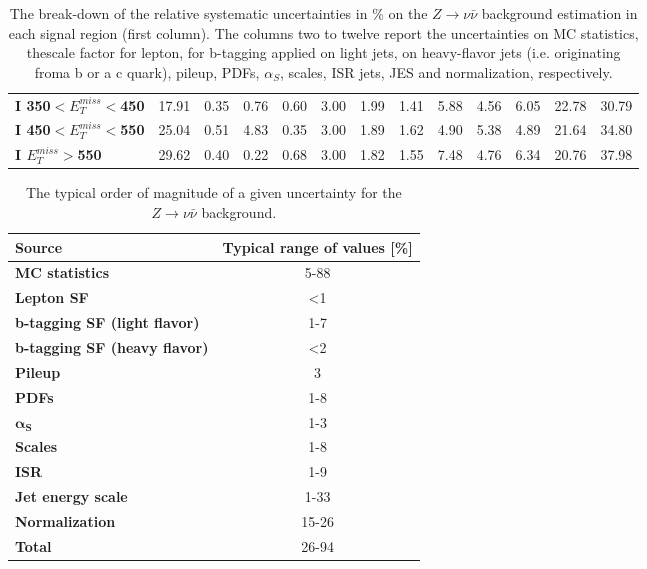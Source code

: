 \begin{table}[h]
\begin{center}
{\begin{tabular}{|l|ccccccccccc|c|}
\textbf{ I 350$<E_T^{miss}<$450}         & 17.91         & 0.35          & 0.76          & 0.60          & 3.00          & 1.99          & 1.41          & 5.88          & 4.56          & 6.05          & 22.78         & 30.79         \\
\textbf{ I 450$<E_T^{miss}<$550}         & 25.04         & 0.51          & 4.83          & 0.35          & 3.00          & 1.89          & 1.62          & 4.90          & 5.38          & 4.89          & 21.64         & 34.80         \\
\textbf{ I $E_T^{miss}>$550}    & 29.62         & 0.40          & 0.22          & 0.68          & 3.00          & 1.82          & 1.55          & 7.48          & 4.76          & 6.34          & 20.76         & 37.98         \\
\hline
\end{tabular}}
\caption[Table caption text]{The break-down of the relative systematic uncertainties in \% on the $Z \to \nu \bar{\nu}$ background estimation in each signal region (first column). The columns two to twelve report the uncertainties on MC statistics, thescale factor for lepton, for b-tagging applied on light jets, on heavy-flavor jets (i.e. originating froma  b or a c quark), pileup, PDFs, $\alpha_{S}$, scales, ISR jets, JES and normalization, respectively.   }
\label{tab:SysZnunu}
\end{center}
\end{table}

\begin{table}[h]
\begin{center}
\begin{tabular}{|l|c|}
\hline
\textbf{Source}       & \textbf{Typical range of values} [\%]                       \\
\hline
\textbf{MC statistics}      &  5-88   \\
\hline
\textbf{Lepton SF}              &  <1  \\
\textbf{b-tagging SF (light flavor)}      &  1-7  \\
\textbf{b-tagging SF (heavy flavor)}      &  <2  \\
\textbf{Pileup}                          &  3  \\
\textbf{PDFs}                 &  1-8  \\
\textbf{$\mathbf{\alpha_{S}}$}                 &  1-3  \\
\textbf{Scales}                 &  1-8  \\
\textbf{ISR}                 &  1-9  \\
\textbf{Jet energy scale}                 &  1-33  \\
\textbf{Normalization}                 &  15-26  \\
\hline
\textbf{Total}                 &  26-94  \\
\hline
\end{tabular}
\caption[Table caption text]{The typical order of magnitude of a given uncertainty for the $Z \to \nu \bar{\nu}$ background.  }
\label{tab:SysZnunuSum}
\end{center}
\end{table}

